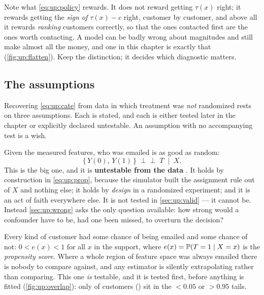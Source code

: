 Note what \cref{eq:up:policy} rewards. It does not reward getting $\tau(x)$ right; it rewards
getting the \emph{sign of $\tau(x) - c$} right, customer by customer, and above all it rewards
\emph{ranking} customers correctly, so that the ones contacted first are the ones worth
contacting. A model can be badly wrong about magnitudes and still make almost all the money, and
one in this chapter is exactly that (\cref{fig:up:flatten}). Keep the distinction; it decides
which diagnostic matters.

\subsection*{The assumptions}

Recovering \cref{eq:up:cate} from data in which treatment was \emph{not} randomized rests on
three assumptions. Each is stated, and each is either tested later in the chapter or explicitly
declared untestable. An assumption with no accompanying test is a wish.

\begin{assumption}[Unconfoundedness]\label{as:up:unconf}
Given the measured features, who was emailed is as good as random:
%
\begin{equation}
  \big\{\,Y(0),\, Y(1)\,\big\} \;\perp\!\!\!\perp\; T \;\;\big|\;\; X .
  \label{eq:up:unconf}
\end{equation}
%
This is the big one, and it is \textbf{untestable from the data} \citep{rosenbaum1983}. It holds
by construction in \cref{eq:up:prop}, because the simulator built the assignment rule out of $X$
and nothing else; it holds by \emph{design} in a randomized experiment; and it is an act of faith
everywhere else. It is not tested in \cref{sec:up:valid} --- it cannot be. Instead
\cref{sec:up:wrong} asks the only question available: how strong would a confounder have to be,
had one been missed, to overturn the decision?
\end{assumption}

\begin{assumption}\label{as:up:overlap}
Every kind of customer had some chance of being emailed and some chance of not:
$0 < e(x) < 1$ for all $x$ in the support, where $e(x) = \operatorname{\mathbb{P}}(T = 1 \mid X = x)$ is the
\emph{propensity score}. Where a whole region of feature space was always emailed there is
nobody to compare against, and any estimator is silently extrapolating rather than comparing.
This one \emph{is} testable, and it is tested first, before anything is fitted
(\cref{fig:up:overlap}): only \nbOneWeakN{} of \nbOneNCustomers{} customers
(\pc{\nbOneWeakPct}) sit in the $<\!0.05$ or $>\!0.95$ tails.
\end{assumption}

